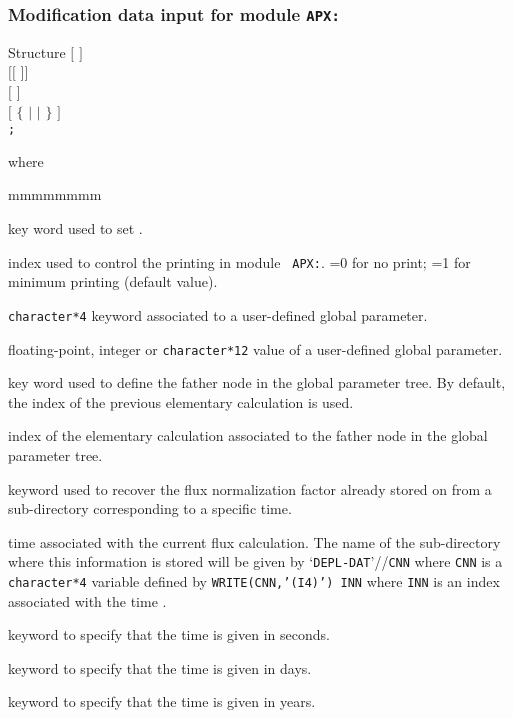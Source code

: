\subsubsection{Modification data input for module {\tt APX:}}\label{sect:descsapx2}

\vskip -0.8cm

\begin{DataStructure}{Structure }
$[$   $]$ \\
$[[$   $]]$ \\
$[$   $]$ \\
$[$   $\{$  $|$  $|$  $\}$ $]$ \\
{\tt ;}
\end{DataStructure}

\goodbreak
\noindent where
\begin{ListeDeDescription}{mmmmmmmm}

\item[\moc{EDIT}] key word used to set .

\item[\dusa{iprint}] index used to control the printing in module {\tt
APX:}. =0 for no print; =1 for minimum printing (default value).

\item[\dusa{parkey}] {\tt character*4} keyword associated to a user-defined global
parameter.

\item[\dusa{value}] floating-point, integer or {\tt character*12} value of a user-defined
global parameter.

\item[\moc{ORIG}] key word used to define the father node in the global parameter tree. By
default, the index of the previous elementary calculation is used.

\item[\dusa{orig}] index of the elementary calculation associated to the father node in the
global parameter tree.

\item[\moc{SET}] keyword used to recover the flux normalization factor already
stored on  from a sub-directory corresponding to a specific time.

\item[\dusa{xtr}] time associated with the current flux calculation. The
name of the sub-directory where this information is stored will be given by
`{\tt DEPL-DAT}'//{\tt CNN} where {\tt CNN} is a  {\tt character*4} variable
defined by  {\tt WRITE(CNN,'(I4)') INN} where {\tt INN} is an index associated
with the time .

\item[\moc{S}] keyword to specify that the time is given in seconds.

\item[\moc{DAY}] keyword to specify that the time is given in days.

\item[\moc{YEAR}] keyword to specify that the time is given in years.

\end{ListeDeDescription}

